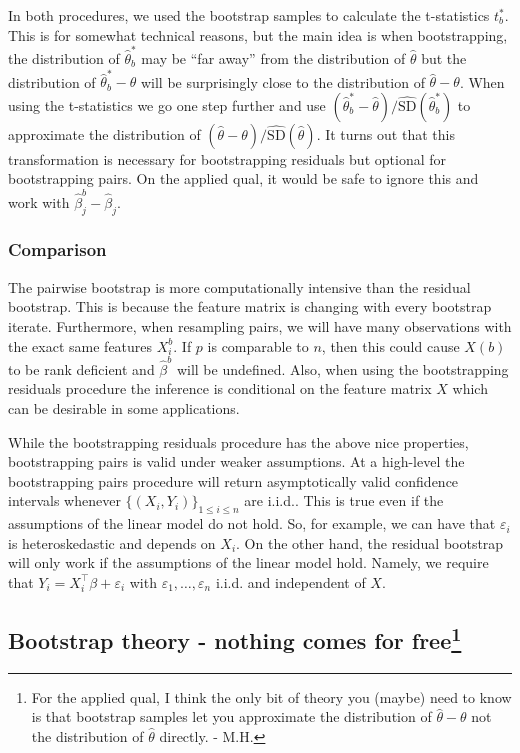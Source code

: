 In both procedures, we used the bootstrap samples to calculate the t-statistics $t^*_b$. This is for somewhat technical reasons, but the main idea is when bootstrapping, the distribution of $\hat{\theta}^*_b$ may be ``far away'' from the distribution of $\hat{\theta}$ but the distribution of $\hat{\theta}^*_b - \hat{\theta}$ will be surprisingly close to the distribution of $\hat{\theta}-\theta$. When using the t-statistics we go one step further and use $(\hat{\theta}^*_b - \hat{\theta})/\widehat{\mathrm{SD}}(\hat{\theta}^*_b)$ to approximate the distribution of $(\hat{\theta}-\theta)/\widehat{\mathrm{SD}}(\hat{\theta})$. It turns out that this transformation is necessary for bootstrapping residuals but optional for bootstrapping pairs. On the applied qual, it would be safe to ignore this and work with $\hat{\beta}^b_j - \hat{\beta}_j$.

\subsubsection*{Comparison} 


The pairwise bootstrap is more computationally intensive than the residual bootstrap. This is because the feature matrix is changing with every bootstrap iterate. Furthermore, when resampling pairs, we will have many observations with the exact same features $X_i^b$. If $p$ is comparable to $n$, then this could cause $X(b)$ to be rank deficient and $\hat{\beta}^b$ will be undefined. Also, when using the bootstrapping residuals procedure the inference is conditional on the feature matrix $X$ which can be desirable in some applications.

While the bootstrapping residuals procedure has the above nice properties, bootstrapping pairs is valid under weaker assumptions. At a high-level the bootstrapping pairs procedure will return asymptotically valid confidence intervals whenever $\{(X_i,Y_i)\}_{1 \le i \le n}$ are i.i.d.. This is true even if the assumptions of the linear model do not hold. So, for example, we can have that $\varepsilon_i$ is heteroskedastic and depends on $X_i$. On the other hand, the residual bootstrap will only work if the assumptions of the linear model hold. Namely, we require that $Y_i = X_i^\top\beta + \varepsilon_i$ with $\varepsilon_1,\dots,\varepsilon_n$ i.i.d. and independent of $X$. 



\subsection{Bootstrap theory - nothing comes for free\footnote{
    For the applied qual, I think the only bit of theory you (maybe) need to know is that bootstrap samples let you approximate the distribution of $\hat{\theta}-\theta$ not the distribution of $\hat{\theta}$ directly. - M.H.}}


